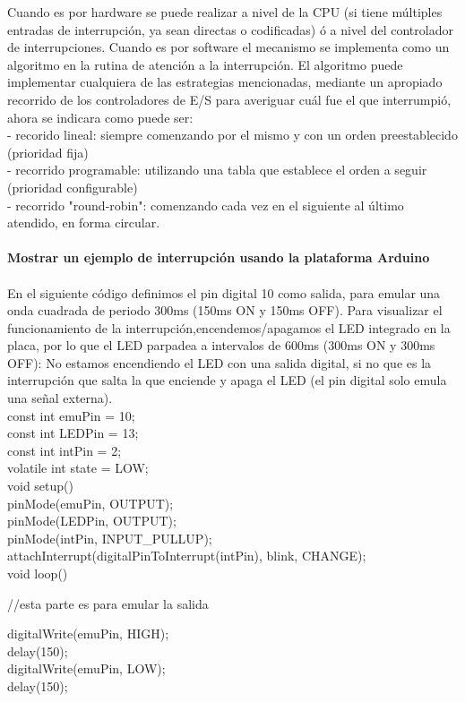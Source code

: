 \documentclass[12pt]{article}
\begin{document}
 Cuando es por hardware se puede realizar a nivel de la CPU (si tiene múltiples entradas de interrupción, ya sean directas o codificadas) ó a nivel del controlador de interrupciones. Cuando es por software el mecanismo se implementa como un algoritmo en la rutina de atención a la interrupción. El algoritmo puede
implementar cualquiera de las estrategias mencionadas, mediante un apropiado recorrido de los controladores de E/S para averiguar cuál fue el que interrumpió, ahora se indicara como puede ser:\\
- recorido lineal: siempre comenzando por el mismo y con un orden preestablecido (prioridad fija)\\
- recorrido programable: utilizando una tabla que establece el orden a seguir (prioridad configurable)\\
- recorrido "round-robin": comenzando cada vez en el siguiente al último
atendido, en forma circular.\cite{aguilerasistemas2015}\\
\\
\textbf{Mostrar un ejemplo de interrupción usando la plataforma Arduino}\\
\\
En el siguiente código definimos el pin digital 10 como salida, para emular una onda cuadrada de periodo 300ms (150ms ON y 150ms OFF).
Para visualizar el funcionamiento de la interrupción,encendemos/apagamos el LED integrado en la placa, por lo que el LED parpadea a intervalos de 600ms (300ms ON y 300ms OFF): No estamos encendiendo el LED con una salida digital, si no que es la interrupción que salta la que enciende y apaga el LED (el pin digital solo emula una señal externa).\\
const int emuPin = 10;\\
const int LEDPin = 13;\\
const int intPin = 2;\\
volatile int state = LOW;\\
void setup() {\\
   pinMode(emuPin, OUTPUT);\\
   pinMode(LEDPin, OUTPUT);\\
   pinMode(intPin, INPUT_PULLUP);\\
   attachInterrupt(digitalPinToInterrupt(intPin), blink, CHANGE);\\
}
void loop() {
   //esta parte es para emular la salida
   
   digitalWrite(emuPin, HIGH);\\
   delay(150);\\
   digitalWrite(emuPin, LOW);\\
   delay(150);\\
}
\end{document}
